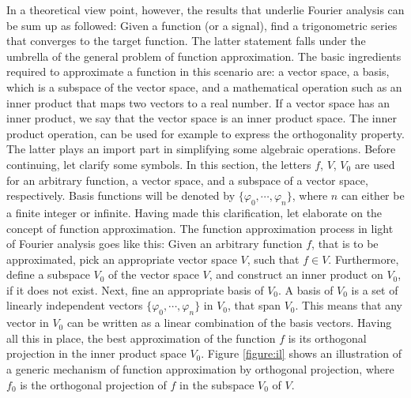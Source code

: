 \documentclass[../Main/thesis.tex]{subfiles}
\begin{document}
\justify
In a theoretical view point, however, the results that underlie Fourier analysis can be sum up as followed: Given a function (or a signal), find a trigonometric series that converges to the target function. The latter statement falls under the umbrella of the general problem of function approximation.  
\justify
The basic ingredients required to approximate a function in this scenario are: a vector space, a basis, which is a subspace of the vector space, and a mathematical operation such as an inner product that maps two vectors to a real number. If a vector space has an inner product, we say that the vector space is an inner product space. The inner product operation, can be used for example to express the orthogonality property. The latter plays an import part in simplifying some algebraic operations.
\justify
Before continuing, let clarify some symbols. In this section, the letters $f$, $V$, $V_{0}$ are used for an arbitrary function, a vector space, and a subspace of a vector space, respectively.
Basis functions will be denoted by $\{  \varphi_{0}, \cdots,\varphi_{n}\}$, where $n$ can either be a finite integer or infinite. Having made this clarification, let elaborate on the concept of function approximation. 
\justify
The function approximation process in light of Fourier analysis goes like this: Given an arbitrary function $f$, that is to be approximated, pick an appropriate vector space $V$, such that $f\in V$. Furthermore, define a subspace $V_{0}$ of the vector space $V$, and construct an inner product on $V_{0}$, if it does not exist. Next, fine an appropriate basis of $V_{0}$.  A basis of $V_{0}$ is a set of linearly independent vectors   $\{  \varphi_{0}, \cdots,\varphi_{n}\}$ in $V_{0}$, that span $V_{0}$. This means that any vector in $V_{0}$ can be written as a linear combination of the basis vectors.
\justify
 Having all this in place, the best approximation of the function $f$ is its orthogonal projection in the inner product space $V_{0}$. Figure \ref{figure:il} shows an illustration of a generic mechanism of function approximation by orthogonal projection, where $f_{0}$ is the orthogonal projection of $f$ in the subspace $V_{0}$ of $V$.
\justify
\end{document}
